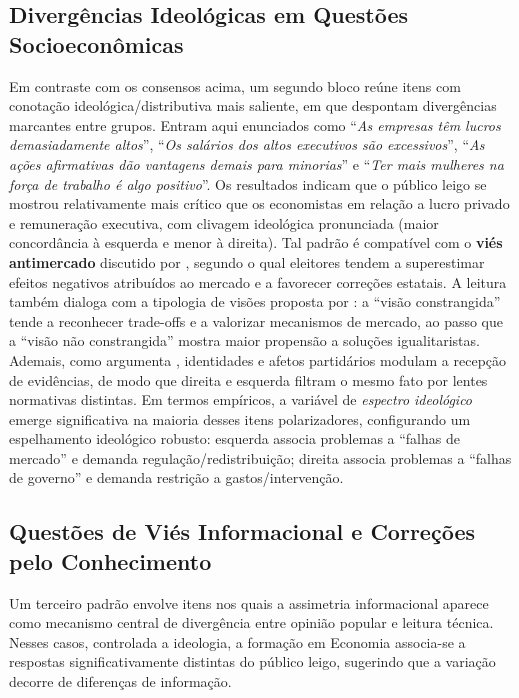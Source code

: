 \subsection{Divergências Ideológicas em Questões Socioeconômicas}
Em contraste com os consensos acima, um segundo bloco reúne itens com conotação ideológica/distributiva mais saliente, em que despontam divergências marcantes entre grupos. Entram aqui enunciados como ``\textit{As empresas têm lucros demasiadamente altos}'', ``\textit{Os salários dos altos executivos são excessivos}'', ``\textit{As ações afirmativas dão vantagens demais para minorias}'' e ``\textit{Ter mais mulheres na força de trabalho é algo positivo}''. Os resultados indicam que o público leigo se mostrou relativamente mais crítico que os economistas em relação a lucro privado e remuneração executiva, com clivagem ideológica pronunciada (maior concordância à esquerda e menor à direita). Tal padrão é compatível com o \textbf{viés antimercado} discutido por , segundo o qual eleitores tendem a superestimar efeitos negativos atribuídos ao mercado e a favorecer correções estatais. A leitura também dialoga com a tipologia de visões proposta por : a ``visão constrangida'' tende a reconhecer trade-offs e a valorizar mecanismos de mercado, ao passo que a ``visão não constrangida'' mostra maior propensão a soluções igualitaristas. Ademais, como argumenta , identidades e afetos partidários modulam a recepção de evidências, de modo que direita e esquerda filtram o mesmo fato por lentes normativas distintas. Em termos empíricos, a variável de \textit{espectro ideológico} emerge significativa na maioria desses itens polarizadores, configurando um espelhamento ideológico robusto: esquerda associa problemas a ``falhas de mercado'' e demanda regulação/redistribuição; direita associa problemas a ``falhas de governo'' e demanda restrição a gastos/intervenção.

\subsection{Questões de Viés Informacional e Correções pelo Conhecimento}
Um terceiro padrão envolve itens nos quais a assimetria informacional aparece como mecanismo central de divergência entre opinião popular e leitura técnica. Nesses casos, controlada a ideologia, a formação em Economia associa-se a respostas significativamente distintas do público leigo, sugerindo que a variação decorre de diferenças de informação.

